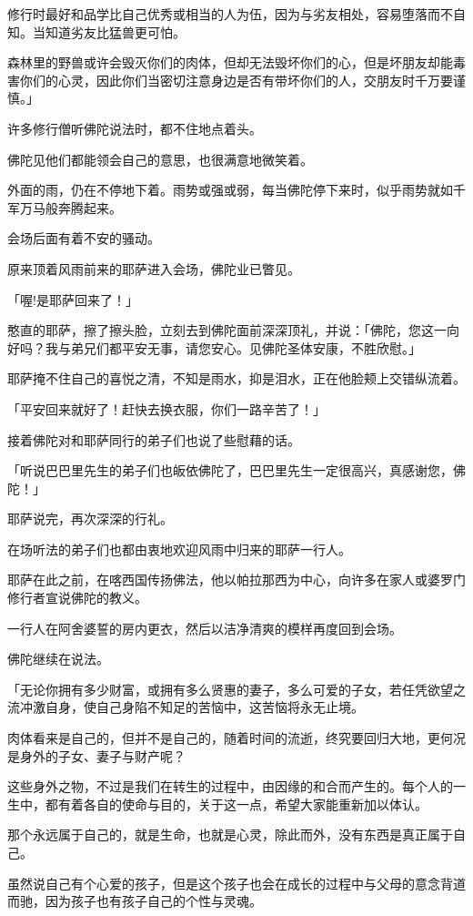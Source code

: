 \documentclass[twoside,openany]{book}
\begin{document}
修行时最好和品学比自己优秀或相当的人为伍，因为与劣友相处，容易堕落而不自知。当知道劣友比猛兽更可怕。

森林里的野兽或许会毁灭你们的肉体，但却无法毁坏你们的心，但是坏朋友却能毒害你们的心灵，因此你们当密切注意身边是否有带坏你们的人，交朋友时千万要谨慎。」

许多修行僧听佛陀说法时，都不住地点着头。

佛陀见他们都能领会自己的意思，也很满意地微笑着。

外面的雨，仍在不停地下着。雨势或强或弱，每当佛陀停下来时，似乎雨势就如千军万马般奔腾起来。

会场后面有着不安的骚动。

原来顶着风雨前来的耶萨进入会场，佛陀业已瞥见。

「喔!是耶萨回来了！」

憨直的耶萨，擦了擦头脸，立刻去到佛陀面前深深顶礼，并说：「佛陀，您这一向好吗？我与弟兄们都平安无事，请您安心。见佛陀圣体安康，不胜欣慰。」

耶萨掩不住自己的喜悦之清，不知是雨水，抑是泪水，正在他脸颊上交错纵流着。

「平安回来就好了！赶快去换衣服，你们一路辛苦了！」

接着佛陀对和耶萨同行的弟子们也说了些慰藉的话。

「听说巴巴里先生的弟子们也皈依佛陀了，巴巴里先生一定很高兴，真感谢您，佛陀！」

耶萨说完，再次深深的行礼。

在场听法的弟子们也都由衷地欢迎风雨中归来的耶萨一行人。

耶萨在此之前，在喀西国传扬佛法，他以帕拉那西为中心，向许多在家人或婆罗门修行者宣说佛陀的教义。

一行人在阿舍婆誓的房内更衣，然后以洁净清爽的模样再度回到会场。

佛陀继续在说法。

「无论你拥有多少财富，或拥有多么贤惠的妻子，多么可爱的子女，若任凭欲望之流冲激自身，使自己身陷不知足的苦恼中，这苦恼将永无止境。

肉体看来是自己的，但并不是自己的，随着时间的流逝，终究要回归大地，更何况是身外的子女、妻子与财产呢？

这些身外之物，不过是我们在转生的过程中，由因缘的和合而产生的。每个人的一生中，都有着各自的使命与目的，关于这一点，希望大家能重新加以体认。

那个永远属于自己的，就是生命，也就是心灵，除此而外，没有东西是真正属于自己。

虽然说自己有个心爱的孩子，但是这个孩子也会在成长的过程中与父母的意念背道而驰，因为孩子也有孩子自己的个性与灵魂。
\end{document}
